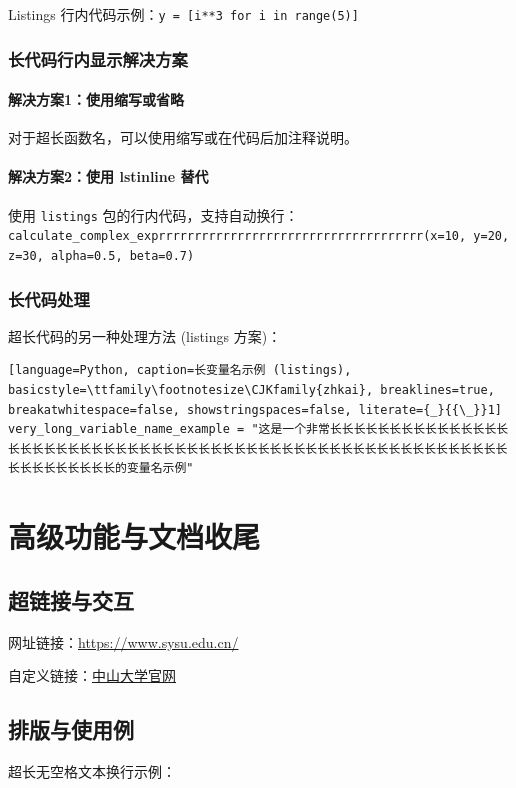 \documentclass[../main]{subfiles}
\begin{document}
Listings 行内代码示例：\lstinline{y = [i**3 for i in range(5)]}

\subsubsection{长代码行内显示解决方案}

\paragraph{解决方案1：使用缩写或省略}
对于超长函数名，可以使用缩写或在代码后加注释说明。

\paragraph{解决方案2：使用 lstinline 替代}
使用 \texttt{listings} 包的行内代码，支持自动换行：\\
\lstinline[breaklines=true]{calculate_complex_exprrrrrrrrrrrrrrrrrrrrrrrrrrrrrrrrrrrrr(x=10, y=20, z=30, alpha=0.5, beta=0.7)}

\subsubsection{长代码处理}
超长代码的另一种处理方法 (listings 方案)：
\begin{lstlisting}[language=Python, caption=长变量名示例 (listings), basicstyle=\ttfamily\footnotesize\CJKfamily{zhkai}, breaklines=true, breakatwhitespace=false, showstringspaces=false, literate={_}{{\_}}1]
very_long_variable_name_example = "这是一个非常长长长长长长长长长长长长长长长长长长长长长长长长长长长长长长长长长长长长长长长长长长长长长长长长长长长长长长长长长长长长长长长长长长的变量名示例"
\end{lstlisting}

\section{高级功能与文档收尾}

\subsection{超链接与交互}
网址链接：\url{https://www.sysu.edu.cn/}

自定义链接：\href{https://www.sysu.edu.cn/}{中山大学官网}

\subsection{排版与使用例}
超长无空格文本换行示例：
\end{document}
